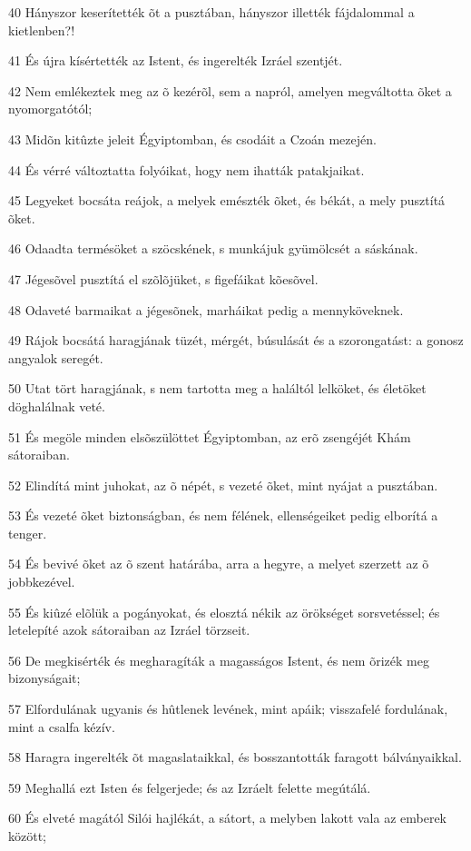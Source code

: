 \par 40 Hányszor keserítették õt a pusztában, hányszor illették fájdalommal a kietlenben?!
\par 41 És újra kísértették az Istent, és ingerelték Izráel szentjét.
\par 42 Nem emlékeztek meg az õ kezérõl, sem a napról, amelyen megváltotta õket a nyomorgatótól;
\par 43 Midõn kitûzte jeleit Égyiptomban, és csodáit a Czoán mezején.
\par 44 És vérré változtatta folyóikat, hogy nem ihatták patakjaikat.
\par 45 Legyeket bocsáta reájok, a melyek emészték õket, és békát, a mely pusztítá õket.
\par 46 Odaadta termésöket a szöcskének, s munkájuk gyümölcsét a sáskának.
\par 47 Jégesõvel pusztítá el szõlõjüket, s figefáikat kõesõvel.
\par 48 Odaveté barmaikat a jégesõnek, marháikat pedig a mennyköveknek.
\par 49 Rájok bocsátá haragjának tüzét, mérgét, búsulását és a szorongatást: a gonosz angyalok seregét.
\par 50 Utat tört haragjának, s nem tartotta meg a haláltól lelköket, és életöket döghalálnak veté.
\par 51 És megöle minden elsõszülöttet Égyiptomban, az erõ zsengéjét Khám sátoraiban.
\par 52 Elindítá mint juhokat, az õ népét, s vezeté õket, mint nyájat a pusztában.
\par 53 És vezeté õket biztonságban, és nem félének, ellenségeiket pedig elborítá a tenger.
\par 54 És bevivé õket az õ szent határába, arra a hegyre, a melyet szerzett az õ jobbkezével.
\par 55 És kiûzé elõlük a pogányokat, és elosztá nékik az örökséget sorsvetéssel; és letelepíté azok sátoraiban az Izráel törzseit.
\par 56 De megkisérték és megharagíták a magasságos Istent, és nem õrizék meg bizonyságait;
\par 57 Elfordulának ugyanis és hûtlenek levének, mint apáik; visszafelé fordulának, mint a csalfa kézív.
\par 58 Haragra ingerelték õt magaslataikkal, és bosszantották faragott bálványaikkal.
\par 59 Meghallá ezt Isten és felgerjede; és az Izráelt felette megútálá.
\par 60 És elveté magától Silói hajlékát, a sátort, a melyben lakott vala az emberek között;
